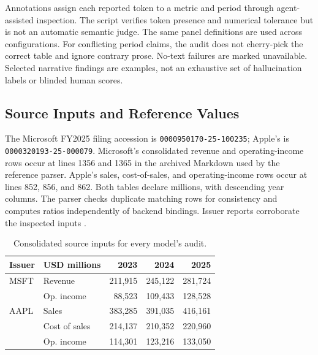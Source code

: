 \documentclass[letterpaper]{article} %
\begin{document}
Annotations assign each reported token to a metric and period through agent-assisted inspection. The script verifies token presence and numerical tolerance but is not an automatic semantic judge. The same panel definitions are used across configurations. For conflicting period claims, the audit does not cherry-pick the correct table and ignore contrary prose. No-text failures are marked unavailable. Selected narrative findings are examples, not an exhaustive set of hallucination labels or blinded human scores.

\subsection{Source Inputs and Reference Values}
The Microsoft FY2025 filing accession is \texttt{0000950170-25-100235}; Apple's is \texttt{0000320193-25-000079}. Microsoft's consolidated revenue and operating-income rows occur at lines 1356 and 1365 in the archived Markdown used by the reference parser. Apple's sales, cost-of-sales, and operating-income rows occur at lines 852, 856, and 862. Both tables declare millions, with descending year columns. The parser checks duplicate matching rows for consistency and computes ratios independently of backend bindings. Issuer reports corroborate the inspected inputs \citep{msft2025report,apple2025results,apple2024results}.

\begin{table}[t]
\centering
\begin{tabular}{llrrr}
\toprule
Issuer & USD millions & 2023 & 2024 & 2025\\
\midrule
MSFT & Revenue & 211,915 & 245,122 & 281,724\\
 & Op. income & 88,523 & 109,433 & 128,528\\
AAPL & Sales & 383,285 & 391,035 & 416,161\\
 & Cost of sales & 214,137 & 210,352 & 220,960\\
 & Op. income & 114,301 & 123,216 & 133,050\\
\bottomrule
\end{tabular}
\caption{Consolidated source inputs for every model's audit.}
\label{tab:inputs}
\end{table}
\end{document}
